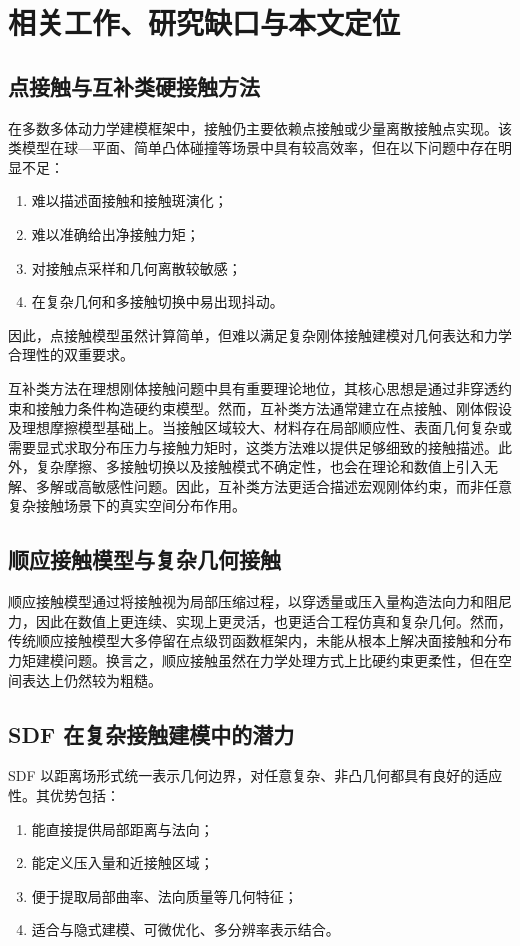 \section{相关工作、研究缺口与本文定位}
\subsection{点接触与互补类硬接触方法}
在多数多体动力学建模框架中，接触仍主要依赖点接触或少量离散接触点实现。该类模型在球—平面、简单凸体碰撞等场景中具有较高效率，但在以下问题中存在明显不足：
\begin{enumerate}[label=(\arabic*)]
    \item 难以描述面接触和接触斑演化；
    \item 难以准确给出净接触力矩；
    \item 对接触点采样和几何离散较敏感；
    \item 在复杂几何和多接触切换中易出现抖动。
\end{enumerate}

因此，点接触模型虽然计算简单，但难以满足复杂刚体接触建模对几何表达和力学合理性的双重要求。

互补类方法在理想刚体接触问题中具有重要理论地位，其核心思想是通过非穿透约束和接触力条件构造硬约束模型。然而，互补类方法通常建立在点接触、刚体假设及理想摩擦模型基础上。当接触区域较大、材料存在局部顺应性、表面几何复杂或需要显式求取分布压力与接触力矩时，这类方法难以提供足够细致的接触描述。此外，复杂摩擦、多接触切换以及接触模式不确定性，也会在理论和数值上引入无解、多解或高敏感性问题。因此，互补类方法更适合描述宏观刚体约束，而非任意复杂接触场景下的真实空间分布作用。

\subsection{顺应接触模型与复杂几何接触}
顺应接触模型通过将接触视为局部压缩过程，以穿透量或压入量构造法向力和阻尼力，因此在数值上更连续、实现上更灵活，也更适合工程仿真和复杂几何。然而，传统顺应接触模型大多停留在点级罚函数框架内，未能从根本上解决面接触和分布力矩建模问题。换言之，顺应接触虽然在力学处理方式上比硬约束更柔性，但在空间表达上仍然较为粗糙。

\subsection{SDF 在复杂接触建模中的潜力}
SDF 以距离场形式统一表示几何边界，对任意复杂、非凸几何都具有良好的适应性。其优势包括：
\begin{enumerate}[label=(\arabic*)]
    \item 能直接提供局部距离与法向；
    \item 能定义压入量和近接触区域；
    \item 便于提取局部曲率、法向质量等几何特征；
    \item 适合与隐式建模、可微优化、多分辨率表示结合。
\end{enumerate}


